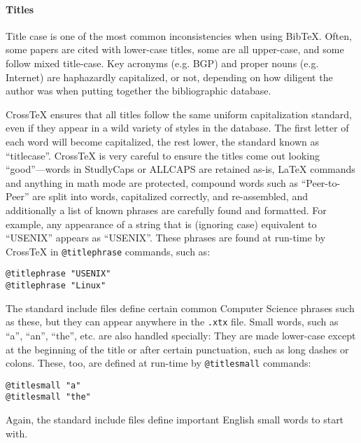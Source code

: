 \documentclass{article}
\newcommand{\XTeX}{Cross\TeX}
\begin{document}
\paragraph{Titles}

Title case is one of the most common inconsistencies when using
BibTeX. Often, some papers are cited with lower-case titles, some are
all upper-case, and some follow mixed title-case. Key acronyms
(e.g. BGP) and proper nouns (e.g. Internet) are haphazardly
capitalized, or not, depending on how diligent the author was when
putting together the bibliographic database.

\XTeX{} ensures that all titles follow the same uniform capitalization standard, even if they appear in a wild variety of styles in the database.  The first letter of each word will become capitalized, the rest lower, the standard known as ``titlecase''.  \XTeX{} is very careful to ensure the titles come out looking ``good''---words in StudlyCaps or ALLCAPS are retained as-is, \LaTeX{} commands and anything in math mode are protected, compound words such as ``Peer-to-Peer'' are split into words, capitalized correctly, and re-assembled, and additionally a list of known phrases are carefully found and formatted.  For example, any appearance of a string that is (ignoring case) equivalent to ``USENIX'' appears as ``USENIX''.  These phrases are found at run-time by \XTeX{} in \texttt{@titlephrase} commands, such as:

\begin{small}\begin{verbatim}
@titlephrase "USENIX"
@titlephrase "Linux"
\end{verbatim}\end{small}

The standard include files define certain common Computer Science phrases such as these, but they can appear anywhere in the \texttt{.xtx} file.
Small words, such as ``a'', ``an'', ``the'', etc. are also handled specially: They are made lower-case except at the beginning of the title or after certain punctuation, such as long dashes or colons.  These, too, are defined at run-time by \texttt{@titlesmall} commands:

\begin{small}\begin{verbatim}
@titlesmall "a"
@titlesmall "the"
\end{verbatim}\end{small}

Again, the standard include files define important English small words to start with.
\end{document}
